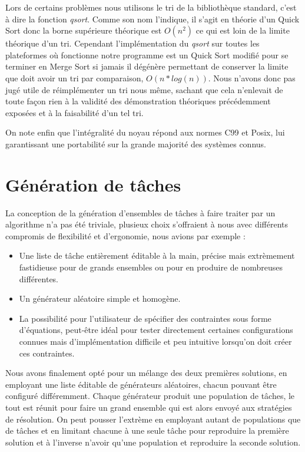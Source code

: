 Lors de certains problèmes nous utilisons le tri de la bibliothèque standard,
c'est à dire la fonction {\em qsort}. Comme son nom l'indique, il s'agit en
théorie d'un Quick Sort donc la borne supérieure théorique est $O(n^2)$ ce qui
est loin de la limite théorique d'un tri. Cependant l'implémentation du {\em
qsort} sur toutes les plateformes où fonctionne notre programme est un Quick
Sort modifié pour se terminer en Merge Sort si jamais il dégénère permettant de
conserver la limite que doit avoir un tri par comparaison, $O(n*log(n))$. Nous
n'avons donc pas jugé utile de réimplémenter un tri nous même, sachant que cela
n'enlevait de toute façon rien à la validité des démonstration théoriques
précédemment exposées et à la faisabilité d'un tel tri.

On note enfin que l'intégralité du noyau répond aux normes C99 et Posix, lui
garantissant une portabilité sur la grande majorité des systèmes connus.
\section{Génération de tâches}
La conception de la génération d'ensembles de tâches à faire traiter par un
algorithme n'a pas été triviale, plusieux choix s'offraient à nous avec différents
compromis de flexibilité et d'ergonomie, nous avions par exemple :
\begin{itemize}
   \item Une liste de tâche entièrement éditable à la main, précise mais extrèmement
   fastidieuse pour de grands ensembles ou pour en produire de nombreuses différentes.
   \item Un générateur aléatoire simple et homogène.
   \item La possibilité pour l'utilisateur de spécifier des contraintes sous forme
   d'équations, peut-être idéal pour tester directement certaines configurations
   connues mais d'implémentation difficile et peu intuitive lorsqu'on doit créer
   ces contraintes.
\end{itemize}
Nous avons finalement opté pour un mélange des deux premières solutions, en
employant une liste éditable de générateurs aléatoires, chacun pouvant être
configuré différemment. Chaque générateur produit une population de tâches,
le tout est réunit pour faire un grand ensemble qui est alors envoyé aux
stratégies de résolution. On peut pousser l'extrème en employant autant de
populations que de tâches et en limitant chacune à une seule tâche pour reproduire
la première solution et à l'inverse n'avoir qu'une population et reproduire la seconde
solution.
